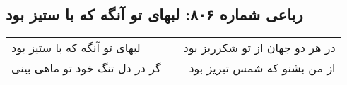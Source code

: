 \begin{center}
\section*{رباعی شماره ۸۰۶: لبهای تو آنگه که با ستیز بود}
\label{sec:0806}
\begin{longtable}{l p{0.5cm} r}
لبهای تو آنگه که با ستیز بود
&&
در هر دو جهان از تو شکرریز بود
\\
گر در دل تنگ خود تو ماهی بینی
&&
از من بشنو که شمس تبریز بود
\\
\end{longtable}
\end{center}
